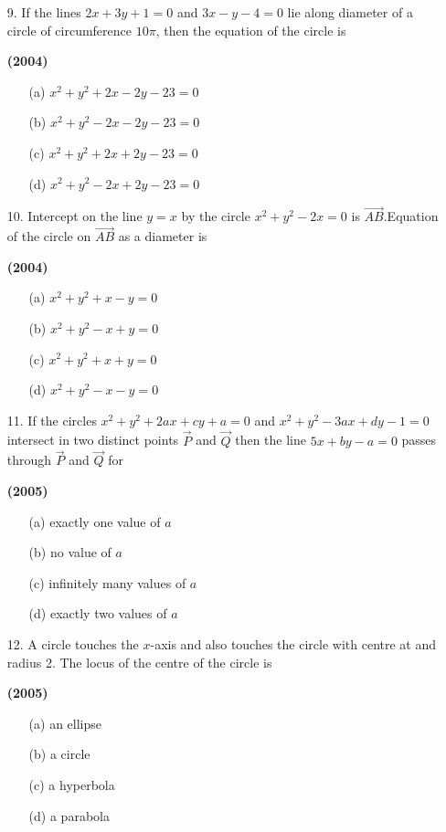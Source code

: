 \documentclass[journal,12pt,twocolumn]{IEEEtran}
\theoremstyle{remark}
\begin{document}
\begin{enumerate}
\item[9.]If the lines $2x+3y+1=0$ and $3x-y-4=0$ lie along diameter of a circle of circumference $10\pi$, then the equation of the circle is 

\hfill{\textbf{(2004)}}

\begin{enumerate}
\item[(a)] $x^2+y^2+2x-2y-23=0$
\item[(b)] $x^2+y^2-2x-2y-23=0$
\item[(c)] $x^2+y^2+2x+2y-23=0$
\item[(d)] $x^2+y^2-2x+2y-23=0$
\end{enumerate}
\end{enumerate}
\begin{enumerate}
\item[10.]Intercept on the line $y=x$ by the circle $x^2+y^2-2x=0$ is $\vec{AB}$.Equation of the circle on $\vec{AB}$ as a diameter is 

\hfill{\textbf{(2004)}}

\begin{enumerate}
\item[(a)] $x^2+y^2+x-y=0$
\item[(b)] $x^2+y^2-x+y=0$
\item[(c)] $x^2+y^2+x+y=0$
\item[(d)] $x^2+y^2-x-y=0$
\end{enumerate}
\end{enumerate}
\begin{enumerate}
\item[11.]If the circles $x^2+y^2+2ax+cy+a=0$ and $x^2+y^2-3ax+dy-1=0$ intersect in two distinct points $\vec{P}$ and $\vec{Q}$ then the line $5x+by-a=0$ passes through $\vec{P}$ and $\vec{Q}$ for

\hfill{\textbf{(2005)}}

\begin{enumerate}
\item[(a)] exactly one value of $a$
\item[(b)] no value of $a$
\item[(c)] infinitely many values of $a$
\item[(d)] exactly two values of $a$
\end{enumerate}
\end{enumerate}
\begin{enumerate}
\item[12.]A circle touches the $x$-axis and also touches the circle with centre at  and radius 2. The locus of the centre of the circle is

\hfill{\textbf{(2005)}}

\begin{enumerate}
\item[(a)] an ellipse
\item[(b)] a circle 
\item[(c)] a hyperbola
\item[(d)] a parabola
\end{enumerate}
\end{enumerate}
\end{document}
